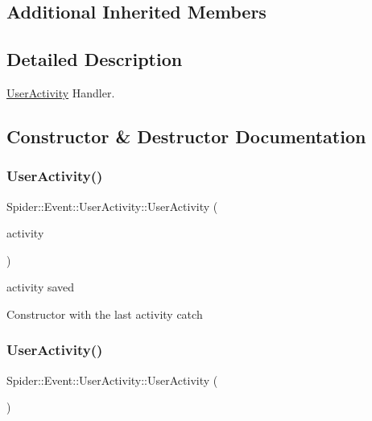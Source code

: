 \subsection*{Additional Inherited Members}


\subsection{Detailed Description}
\hyperlink{class_spider_1_1_event_1_1_user_activity}{User\+Activity} Handler. 

\subsection{Constructor \& Destructor Documentation}
\mbox{\label{class_spider_1_1_event_1_1_user_activity_a01787e3d65e72b720f322d393e5f7b68}} 
\subsubsection{\texorpdfstring{User\+Activity()}{UserActivity()}\hspace{0.1cm}{\footnotesize\ttfamily [1/2]}}
{\footnotesize\ttfamily Spider\+::\+Event\+::\+User\+Activity\+::\+User\+Activity (\begin{DoxyParamCaption}\item[{std\+::string}]{activity }\end{DoxyParamCaption})}



activity saved 

Constructor with the last activity catch \mbox{\label{class_spider_1_1_event_1_1_user_activity_ab7a38e9fbb599851895088657f62915c}} 
\subsubsection{\texorpdfstring{User\+Activity()}{UserActivity()}\hspace{0.1cm}{\footnotesize\ttfamily [2/2]}}
{\footnotesize\ttfamily Spider\+::\+Event\+::\+User\+Activity\+::\+User\+Activity (\begin{DoxyParamCaption}\item[{const \hyperlink{class_spider_1_1_event_1_1_user_activity}{User\+Activity} \&}]{ }\end{DoxyParamCaption})\hspace{0.3cm}{\ttfamily [delete]}}



